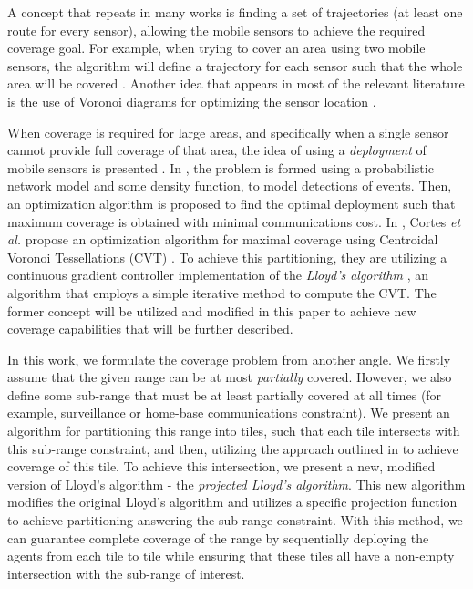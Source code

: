 \documentclass{iacas}
\begin{document}
A concept that repeats in many works is finding a set of trajectories (at least one route for every sensor), allowing the mobile sensors to achieve the required coverage goal.  For example, when trying to cover an area using two mobile sensors, the algorithm will define a trajectory for each sensor such that the whole area will be covered \cite{Atinc2013,Hussein2007}.
Another idea that appears in most of the relevant literature is the use of Voronoi diagrams for optimizing the sensor location \cite{Cortes2004,Hussein2007}. 

When coverage is required for large areas, and specifically when a single sensor cannot provide full coverage of that area, the idea of using a \emph{deployment} of mobile sensors is presented \cite{Cassandras2005, Cortes2004}. In \cite{Li2005}, the problem is formed using a probabilistic network model and some density function, to model detections of events. Then, an optimization algorithm is proposed to find the optimal deployment such that maximum coverage is obtained with minimal communications cost. In \cite{Cortes2004}, Cortes \textit{et al.} propose an optimization algorithm for maximal coverage using Centroidal Voronoi Tessellations (CVT) \cite{Du1999}. To achieve this partitioning, they are utilizing a continuous gradient controller implementation of the \emph{Lloyd's algorithm} \cite{Lloyd1982}, an algorithm that employs a simple iterative method to compute the CVT. The former concept will be utilized and modified in this paper to achieve new coverage capabilities that will be further described.

In this work, we formulate the coverage problem from another angle. We firstly assume that the given range can be at most \emph{partially} covered. However, we also define some sub-range that must be at least partially covered at all times (for example, surveillance or home-base communications constraint). We present an algorithm for partitioning this range into tiles, such that each tile intersects with this sub-range constraint, and then, utilizing the approach outlined in \cite{Cortes2004} to achieve coverage of this tile. To achieve this intersection, we present a new, modified version of Lloyd's algorithm - the \emph{projected Lloyd's algorithm}. This new algorithm modifies the original Lloyd's algorithm and utilizes a specific projection function to achieve partitioning answering the sub-range constraint. With this method, we can guarantee complete coverage of the range by sequentially deploying the agents from each tile to tile while ensuring that these tiles all have a non-empty intersection with the sub-range of interest.
\end{document}
